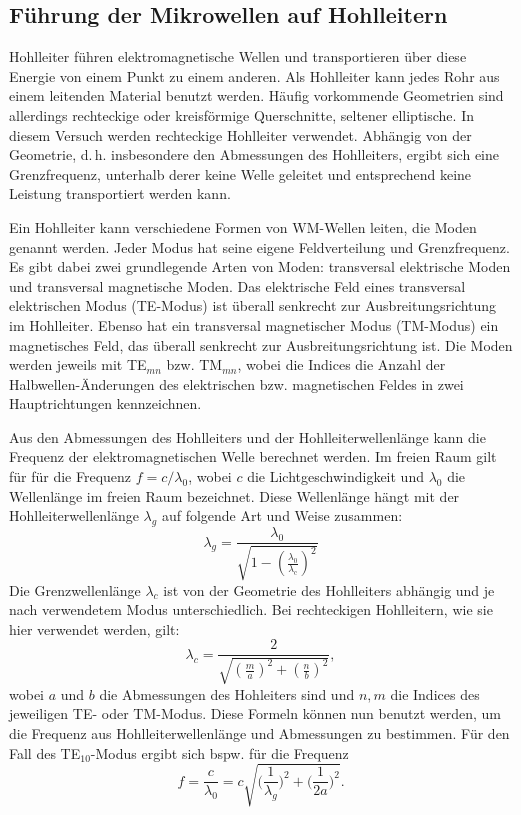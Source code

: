 \subsection{Führung der Mikrowellen auf Hohlleitern}

Hohlleiter führen elektromagnetische Wellen und transportieren über
diese Energie von einem Punkt zu einem anderen.  Als Hohlleiter kann
jedes Rohr aus einem leitenden Material benutzt werden.  Häufig
vorkommende Geometrien sind allerdings rechteckige oder kreisförmige
Querschnitte, seltener elliptische.  In diesem Versuch werden
rechteckige Hohlleiter verwendet.  Abhängig von der Geometrie,
d.\,h. insbesondere den Abmessungen des Hohlleiters, ergibt sich eine
Grenzfrequenz, unterhalb derer keine Welle geleitet und entsprechend
keine Leistung transportiert werden kann.

Ein Hohlleiter kann verschiedene Formen von WM-Wellen leiten, die Moden
genannt werden. Jeder Modus hat seine eigene Feldverteilung und
Grenzfrequenz. Es gibt dabei zwei grundlegende Arten von Moden:
transversal elektrische Moden und transversal magnetische Moden.  Das
elektrische Feld eines transversal elektrischen Modus (TE-Modus) ist
überall senkrecht zur Ausbreitungsrichtung im Hohlleiter.  Ebenso hat
ein transversal magnetischer Modus (TM-Modus) ein magnetisches Feld, das
überall senkrecht zur Ausbreitungsrichtung ist.  Die Moden werden
jeweils mit TE$_{mn}$ bzw. TM$_{mn}$, wobei die Indices die Anzahl der
Halbwellen-Änderungen des elektrischen bzw. magnetischen Feldes in zwei
Hauptrichtungen kennzeichnen.

Aus den Abmessungen des Hohlleiters und der Hohlleiterwellenlänge kann
die Frequenz der elektromagnetischen Welle berechnet werden. Im freien
Raum gilt für für die Frequenz $f = c/\lambda_0$, wobei $c$ die
Lichtgeschwindigkeit und $\lambda_0$ die Wellenlänge im freien Raum
bezeichnet.  Diese Wellenlänge hängt mit der Hohlleiterwellenlänge
$\lambda_g$ auf folgende Art und Weise zusammen:
%
\begin{equation}
  \lambda_g = \frac{\lambda_0}{\sqrt{1 - \left(\frac{\lambda_0}{\lambda_\text{c}}\right)^2}}
\end{equation}
%
Die Grenzwellenlänge $\lambda_c$ ist von der Geometrie des Hohlleiters
abhängig und je nach verwendetem Modus unterschiedlich. Bei rechteckigen
Hohlleitern, wie sie hier verwendet werden, gilt:
\begin{equation}
  \lambda_c = \frac{2}{\sqrt{\left(\frac{m}{a}\right)^2 + \left(\frac{n}{b}\right)^2}},
\end{equation}
%
wobei $a$ und $b$ die Abmessungen des Hohleiters sind und $n, m$ die
Indices des jeweiligen TE- oder TM-Modus.  Diese Formeln können nun
benutzt werden, um die Frequenz aus Hohlleiterwellenlänge und
Abmessungen zu bestimmen. Für den Fall des TE$_{10}$-Modus ergibt sich
bspw. für die Frequenz
%
\begin{equation}
  \label{eq:freq-hohl}
  f = \frac{c}{\lambda_0} = c \sqrt{\Big(\frac{1}{\lambda_g}\Big)^2 + \Big(\frac{1}{2a}\Big)^2}.
\end{equation}

